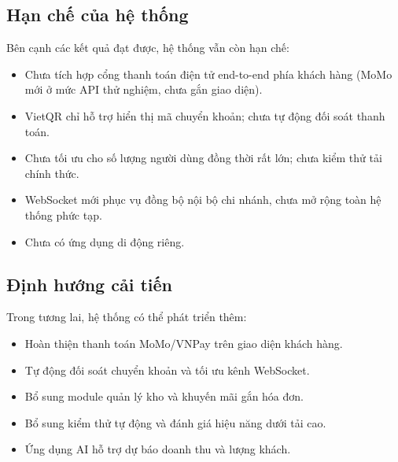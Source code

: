 \documentclass[../DoAn.tex]{subfiles}
\begin{document}
\subsection{Hạn chế của hệ thống}

Bên cạnh các kết quả đạt được, hệ thống vẫn còn hạn chế:
\begin{itemize}
    \item Chưa tích hợp cổng thanh toán điện tử end-to-end phía khách hàng (MoMo mới ở mức API thử nghiệm, chưa gắn giao diện).
    \item VietQR chỉ hỗ trợ hiển thị mã chuyển khoản; chưa tự động đối soát thanh toán.
    \item Chưa tối ưu cho số lượng người dùng đồng thời rất lớn; chưa kiểm thử tải chính thức.
    \item WebSocket mới phục vụ đồng bộ nội bộ chi nhánh, chưa mở rộng toàn hệ thống phức tạp.
    \item Chưa có ứng dụng di động riêng.
\end{itemize}

\subsection{Định hướng cải tiến}

Trong tương lai, hệ thống có thể phát triển thêm:
\begin{itemize}
    \item Hoàn thiện thanh toán MoMo/VNPay trên giao diện khách hàng.
    \item Tự động đối soát chuyển khoản và tối ưu kênh WebSocket.
    \item Bổ sung module quản lý kho và khuyến mãi gắn hóa đơn.
    \item Bổ sung kiểm thử tự động và đánh giá hiệu năng dưới tải cao.
    \item Ứng dụng AI hỗ trợ dự báo doanh thu và lượng khách.
\end{itemize}
\end{document}
